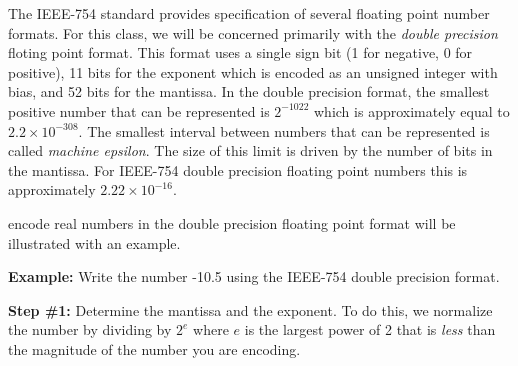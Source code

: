 The IEEE-754 standard provides specification of several floating point number formats.  For this class, we will be concerned primarily with the \emph{double precision} floting point format.  This format uses a single sign bit (1 for negative, 0 for positive), 11 bits for the exponent which is encoded as an unsigned integer with bias, and 52 bits for the mantissa.  In the double precision format, the smallest positive number that can be represented is $2^{-1022}$ which is approximately equal to $2.2 \times 10^{-308}$. The smallest interval between numbers that can be represented is called \emph{machine epsilon}.  The size of this limit is driven by the number of bits in the mantissa.  For IEEE-754 double precision floating point numbers this is approximately $2.22 \times 10^{-16}$.

 encode real numbers in the double precision floating point format will be illustrated with an example.

\vspace{0.5cm}

\noindent\textbf{Example:} Write the number -10.5 using the IEEE-754 double precision format.

\vspace{0.25cm}

\noindent\textbf{Step \#1:} Determine the mantissa and the exponent.  To do this, we normalize the number by dividing by $2^e$ where $e$ is the largest power of 2 that is \emph{less} than the magnitude of the number you are encoding.  

\vspace{0.1cm} 

